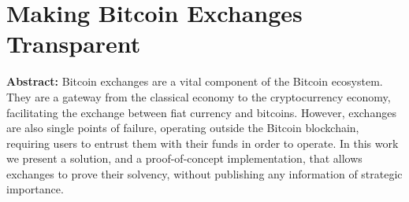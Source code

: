 \section{Making Bitcoin Exchanges Transparent}

\textbf{Abstract:} 
Bitcoin exchanges are a vital component of the Bitcoin ecosystem. They are a gateway from the classical economy to the cryptocurrency economy, facilitating the exchange between fiat currency and bitcoins. However, exchanges are also single points of failure, operating outside the Bitcoin blockchain, requiring users to entrust them with their funds in order to operate. In this work we present a solution, and a proof-of-concept implementation, that allows exchanges to prove their solvency, without publishing any information of strategic importance.
